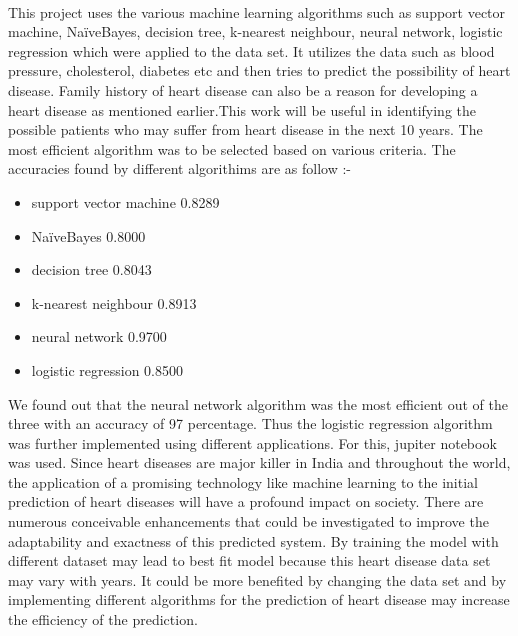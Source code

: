 \documentclass[oneside,12pt]{Classes/VTU}
\begin{document}
	\paragraph{} This project uses the various machine learning algorithms such as support vector machine, NaïveBayes,   decision   tree,  k-nearest neighbour, neural network, logistic regression which were applied  to  the data   set.  It  utilizes the data such  as blood  pressure, cholesterol,  diabetes etc and then tries to predict the possibility of heart disease. Family history of heart disease can also be a reason for developing a heart disease as mentioned earlier.This work will be useful in identifying the possible patients who may  suffer from heart disease in the next 10 years. The most efficient algorithm was to be selected based on various criteria. The accuracies found by different algorithims are as follow :-\\
	\begin{itemize}
		\item support vector machine   0.8289   
		\item  NaïveBayes   0.8000   
		\item decision tree   0.8043
		\item  k-nearest neighbour   0.8913 
		\item neural network   0.9700 
		\item logistic regression 0.8500\\
	\end{itemize}
	We found out that the neural network algorithm was the most efficient out of the three with an accuracy of 97 percentage. Thus the logistic regression algorithm was further implemented using different applications. For this, jupiter notebook was used. Since heart diseases are major killer in India and throughout the world, the application of a promising technology like machine learning to the initial prediction of heart diseases will have a profound impact on society. There are numerous conceivable enhancements that could be investigated to improve the adaptability and exactness of this predicted system. By training the model with different dataset may lead to best fit model because this heart disease data set may vary with years. It could be more benefited by changing the data set and by implementing different algorithms for the prediction of heart disease may increase the efficiency of the prediction.\\
	\\
\end{document}
